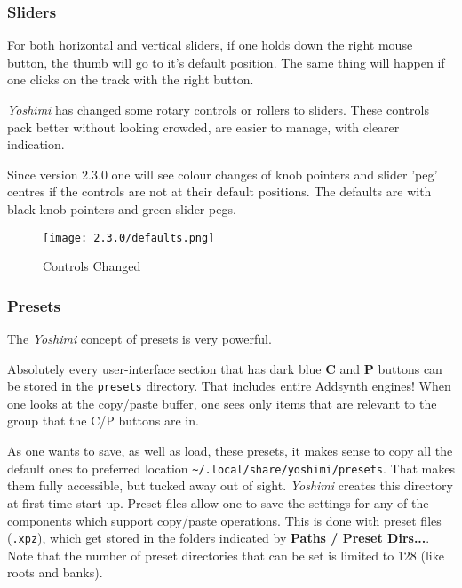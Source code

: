 \subsubsection{Sliders}
\label{subsubsec:stock_settings_elements_sliders}

   For both horizontal and vertical sliders, if one holds down the right mouse
   button, the thumb will go to it's default position.  The same thing will
   happen if one clicks on the track with the right button.

   \textsl{Yoshimi} has changed some rotary controls or rollers to sliders.
   These controls pack better without looking crowded, are easier to manage,
   with clearer indication.

   Since version 2.3.0 one will see colour changes of knob pointers and slider 'peg' centres if the controls are not at their default positions. The defaults are with black knob pointers and green slider pegs.
   \begin{figure}[H]
   \centering
   \texttt{[image: 2.3.0/defaults.png]}
   \caption{Controls Changed}
   \label{fig:changed_controls}
\end{figure}

\subsubsection{Presets}
\label{subsubsec:stock_settings_elements_presets}

   The \textsl{Yoshimi} concept of presets is very powerful.

   Absolutely every user-interface section that has dark blue \textbf{C}
   and \textbf{P} buttons can be
   stored in the \texttt{presets} directory. That includes entire Addsynth
   engines! When one looks at the copy/paste buffer, one sees only items that
   are relevant to the group that the C/P buttons are in.

   As one wants to save, as well as load, these presets, it makes sense to copy
   all the default ones to preferred location
   \texttt{\textasciitilde/.local/share/yoshimi/presets}.
   That makes them fully accessible, but
   tucked away out of sight.  \textsl{Yoshimi} creates this directory at first
   time start up.
   Preset files allow one to save the
   settings for any of the components which support copy/paste operations.
   This is done with preset files (\texttt{.xpz}), which get stored in the
   folders indicated by \textbf{Paths / Preset Dirs...}.
   Note that the number of preset directories that can be set is limited to 128 (like roots and banks).

